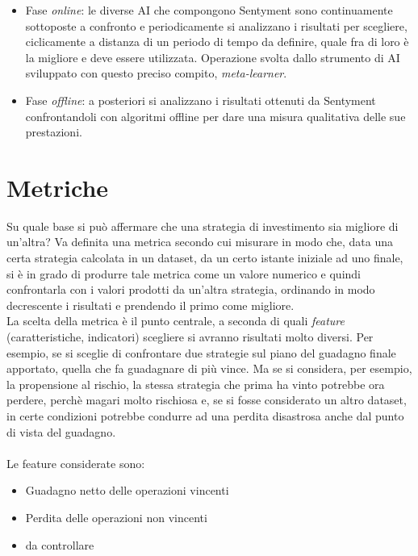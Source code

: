 \documentclass[a4paper,12pt]{report}
\begin{document}
\begin{itemize}
	\item Fase \textit{online}: le diverse AI che compongono Sentyment sono continuamente sottoposte a confronto e periodicamente si analizzano i risultati per scegliere, ciclicamente a distanza di un periodo di tempo da definire, quale fra di loro è la migliore e deve essere utilizzata. Operazione svolta dallo strumento di AI sviluppato con questo preciso compito, \textit{meta-learner}.
	\item Fase \textit{offline}: a posteriori si analizzano i risultati ottenuti da Sentyment confrontandoli con algoritmi offline per dare una misura qualitativa delle sue prestazioni. %
\end{itemize}

\section{Metriche}
Su quale base si può affermare che una strategia di investimento sia migliore di un'altra? Va definita una metrica secondo cui misurare in modo che, data una certa strategia calcolata in un dataset, da un certo istante iniziale ad uno finale, si è in grado di produrre tale metrica come un valore numerico e quindi confrontarla con i valori prodotti da un'altra strategia, ordinando in modo decrescente i risultati e prendendo il primo come migliore.\\ La scelta della metrica è il punto centrale, a seconda di quali \textit{feature} (caratteristiche, indicatori) scegliere si avranno risultati molto diversi. Per esempio, se si sceglie di confrontare due strategie sul piano del guadagno finale apportato, quella che fa guadagnare di più vince. Ma se si considera, per esempio, la propensione al rischio, la stessa strategia che prima ha vinto potrebbe ora perdere, perchè magari molto rischiosa e, se si fosse considerato un altro dataset, in certe condizioni potrebbe condurre ad una perdita disastrosa anche dal punto di vista del guadagno.\\~\\ Le feature considerate sono:
\begin{itemize}
	\item Guadagno netto delle operazioni vincenti
	\item Perdita delle operazioni non vincenti
	\item da controllare %
\end{itemize}
\end{document}
